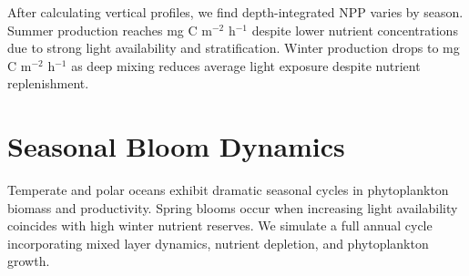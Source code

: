 \documentclass[a4paper, 11pt]{article}
\begin{document}
After calculating vertical profiles, we find depth-integrated NPP varies by season. Summer
production reaches  mg C m$^{-2}$ h$^{-1}$ despite lower nutrient
concentrations due to strong light availability and stratification. Winter production drops
to  mg C m$^{-2}$ h$^{-1}$ as deep mixing reduces average light exposure
despite nutrient replenishment.

\section{Seasonal Bloom Dynamics}

Temperate and polar oceans exhibit dramatic seasonal cycles in phytoplankton biomass and productivity.
Spring blooms occur when increasing light availability coincides with high winter nutrient reserves.
We simulate a full annual cycle incorporating mixed layer dynamics, nutrient depletion, and
phytoplankton growth.
\end{document}
